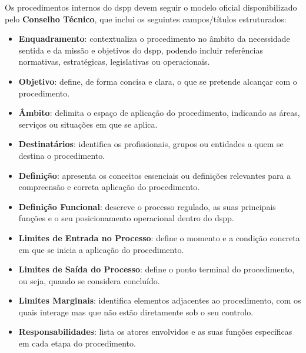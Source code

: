 \label{anexo-estrutura-modelo-procedimento}

Os procedimentos internos do \gls{dspp} devem seguir o modelo oficial disponibilizado pelo \textbf{Conselho Técnico}, que inclui os seguintes campos/títulos estruturados:

\begin{itemize}
  \item \textbf{Enquadramento}: contextualiza o procedimento no âmbito da necessidade sentida e da missão e objetivos do \gls{dspp}, podendo incluir referências normativas, estratégicas, legislativas ou operacionais.
  
  \item \textbf{Objetivo}: define, de forma concisa e clara, o que se pretende alcançar com o procedimento.

  \item \textbf{Âmbito}: delimita o espaço de aplicação do procedimento, indicando as áreas, serviços ou situações em que se aplica.

  \item \textbf{Destinatários}: identifica os profissionais, grupos ou entidades a quem se destina o procedimento.

  \item \textbf{Definição}: apresenta os conceitos essenciais ou definições relevantes para a compreensão e correta aplicação do procedimento.

  \item \textbf{Definição Funcional}: descreve o processo regulado, as suas principais funções e o seu posicionamento operacional dentro do \gls{dspp}.

  \item \textbf{Limites de Entrada no Processo}: define o momento e a condição concreta em que se inicia a aplicação do procedimento.

  \item \textbf{Limites de Saída do Processo}: define o ponto terminal do procedimento, ou seja, quando se considera concluído.

  \item \textbf{Limites Marginais}: identifica elementos adjacentes ao procedimento, com os quais interage mas que não estão diretamente sob o seu controlo.

  \item \textbf{Responsabilidades}: lista os atores envolvidos e as suas funções específicas em cada etapa do procedimento.


\end{itemize}
